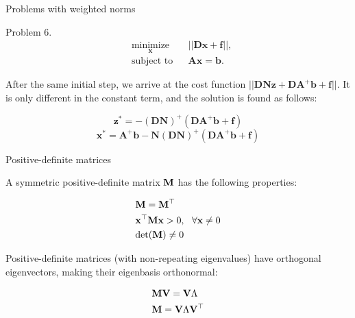 \documentclass{beamer}
\begin{document}
\begin{frame}{Problems with weighted norms}
\begin{flushleft}

Problem 6. 
%
\begin{equation}
\begin{aligned}
& \underset{\mathbf{x}}{\text{minimize}}
& & || \mathbf{D}\mathbf{x} + \mathbf{f} ||, \\
& \text{subject to}
& & \mathbf{A} \mathbf{x} = \mathbf{b}.
\end{aligned}
\end{equation}

After the same initial step, we arrive at the cost function $|| \mathbf{D}\mathbf{N}\mathbf{z} + \mathbf{D}\mathbf{A}^+\mathbf{b} + \mathbf{f}||$. It is only different in the constant term, and the solution is found as follows:


\begin{equation}
    \mathbf{z}^* = -(\mathbf{D}\mathbf{N})^+ (\mathbf{D}\mathbf{A}^+\mathbf{b} + \mathbf{f})
\end{equation}
\begin{equation}
    \mathbf{x}^* = \mathbf{A}^+\mathbf{b}-\mathbf{N}(\mathbf{D}\mathbf{N})^+ (\mathbf{D}\mathbf{A}^+\mathbf{b} + \mathbf{f})
\end{equation}


\end{flushleft}
\end{frame}




\begin{frame}{Positive-definite matrices}
	\begin{flushleft}
		
		A symmetric positive-definite matrix $\mathbf{M}$ has the following properties:
		
		\begin{align}
			&\mathbf{M} = \mathbf{M}^\top
			\\
			&\mathbf{x}^\top \mathbf{M} \mathbf{x} > 0, \ \ \forall \mathbf{x} \neq 0
			\\
			& \text{det}(\mathbf{M}) \neq 0
		\end{align}
		
		Positive-definite matrices (with non-repeating eigenvalues) have orthogonal eigenvectors, making their eigenbasis orthonormal:
		
		\begin{align}
			& \mathbf{M} \mathbf{V} = \mathbf{V} \Lambda  
			\\
			& \mathbf{M} = \mathbf{V} \Lambda \mathbf{V}^\top 
		\end{align}
		
	\end{flushleft}
\end{frame}
\end{document}
